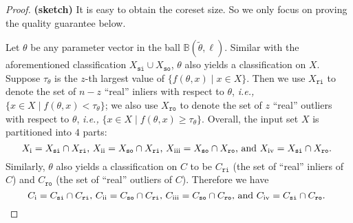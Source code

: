 \documentclass{article}
\newcommand{\Rnum}[1]{\uppercase\expandafter{\romannumeral #1} }
\begin{document}
\begin{proof}\textbf{(sketch)} 
It is easy to obtain the coreset size. So we only focus on proving the quality guarantee below. 

Let $\theta$ be any parameter vector in the ball $ \mathbb{B}(\tilde{\theta}, \ell) $. Similar with the aforementioned classification $X_{\mathtt{si}}\cup X_{\mathtt{so}}$, $\theta$ also yields a classification on $X$. Suppose $\tau_\theta$ is the $z$-th largest value of $\{f(\theta, x)\mid x\in X\}$. Then we use  $X_{\mathtt{ri}}$ to denote the set of $n-z$ ``real'' inliers with respect to $\theta$,  {\em i.e.,} $\{x\in X\mid f(\theta, x)<\tau_\theta\}$; we also use   $X_{\mathtt{ro}}$ to denote the set of $z$ ``real'' outliers with respect to $\theta$,  {\em i.e.,} $\{x\in X\mid f(\theta, x)\geq\tau_\theta\}$. Overall, the input set $X$ is partitioned into $4$ parts: 
\begin{equation}
\text{$ X_{\mathrm{\Rnum{1}}}=X_{\mathtt{si}}\cap X_{\mathtt{ri}}$, $ X_{\mathrm{\Rnum{2}}}=X_{\mathtt{so}}\cap X_{\mathtt{ri}}$, $ X_{\mathrm{\Rnum{3}}}=X_{\mathtt{so}}\cap X_{\mathtt{ro}}$, and $ X_{\mathrm{\Rnum{4}}}=X_{\mathtt{si}}\cap X_{\mathtt{ro}}$. }
\end{equation}
Similarly, $\theta$ also yields a classification on $C$ to be $C_{\mathtt{ri}}$ (the set of ``real'' inliers of $C$) and $C_{\mathtt{ro}}$ (the set of ``real'' outliers of $C$). Therefore we have 
\begin{equation}
\text{$ C_{\mathrm{\Rnum{1}}}=C_{\mathtt{si}}\cap C_{\mathtt{ri}}$, $ C_{\mathrm{\Rnum{2}}}=C_{\mathtt{so}}\cap C_{\mathtt{ri}}$, $ C_{\mathrm{\Rnum{3}}}=C_{\mathtt{so}}\cap C_{\mathtt{ro}}$, and $ C_{\mathrm{\Rnum{4}}}=C_{\mathtt{si}}\cap C_{\mathtt{ro}}$. }
\end{equation}




\end{proof}
\end{document}

